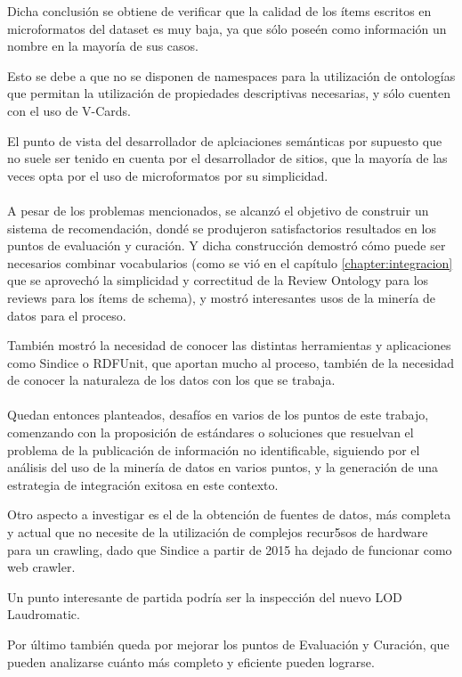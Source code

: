 Dicha conclusión  se obtiene de verificar que la calidad de los ítems escritos en microformatos del 
dataset es muy baja, ya que sólo poseén como información un nombre en la mayoría de sus casos.

Esto se debe a que no se disponen de namespaces para la utilización de ontologías que permitan 
la utilización de propiedades descriptivas necesarias, y sólo cuenten con el uso de V-Cards.

El punto de vista del desarrollador de aplciaciones semánticas por supuesto que no suele ser tenido 
en cuenta por el desarrollador de sitios, que la mayoría de las veces opta por el uso de 
microformatos por su simplicidad.
\\\\
A pesar de los problemas mencionados, se alcanzó el objetivo de construir un sistema de recomendación, 
dondé se produjeron satisfactorios resultados en los puntos de evaluación y curación. 
Y dicha construcción demostró cómo puede ser necesarios combinar vocabularios (como se vió en 
el capítulo \ref{chapter:integracion} que se aprovechó la simplicidad y correctitud de la 
Review Ontology para los reviews para los ítems de schema), y mostró interesantes usos 
de la minería de datos para el proceso.

También mostró la necesidad de conocer las distintas herramientas y aplicaciones como Sindice 
o RDFUnit, que aportan mucho al proceso, también de la necesidad de conocer la naturaleza de 
los datos con los que se trabaja.
\\\\
Quedan entonces planteados, desafíos en varios de los puntos de este trabajo, comenzando con 
la proposición de estándares o soluciones que resuelvan el problema de la publicación de información 
no identificable, siguiendo por el análisis del uso de la minería de datos en varios puntos, y 
la generación de una estrategia de integración exitosa en este contexto. 

Otro aspecto a investigar es el de la obtención de fuentes de datos, más completa y actual que
no necesite de la utilización de complejos recur5sos de hardware para un crawling, dado 
que Sindice a partir de 2015 ha dejado de funcionar como web crawler.

Un punto interesante de partida podría ser la inspección del nuevo LOD Laudromatic.

Por último también queda por mejorar los puntos de Evaluación y Curación, que pueden analizarse 
cuánto más completo y eficiente pueden lograrse.
